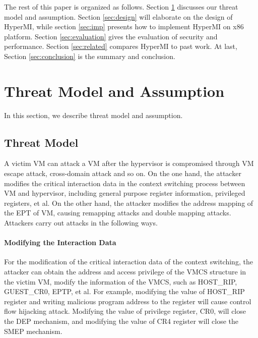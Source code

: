 \documentclass[conference]{IEEEtran}
\begin{document}
The rest of this paper is organized as follows. Section \ref{sec:threat} discusses our threat model and assumption. Section \ref{sec:design} will elaborate on the design of HyperMI, while section \ref{sec:imp} presents how to implement HyperMI on x86 platform. Section \ref{sec:evaluation} gives the evaluation of security and performance. Section \ref{sec:related} compares HyperMI to past work. At last, Section \ref{sec:conclusion} is the summary and conclusion.
\section{Threat Model and Assumption}\label{sec:threat}
In this section, we describe threat model and assumption.
\subsection{Threat Model} \label {threat}
A victim VM can attack a VM after the hypervisor is compromised through VM escape attack, cross-domain attack and so on.
On the one hand, the attacker modifies the critical interaction data in the context switching process between VM and hypervisor, including general purpose register information, privileged registers, et al. On the other hand, the attacker modifies the address mapping of the EPT of VM, causing remapping attacks and double mapping attacks. Attackers carry out attacks in the following ways.
\paragraph{Modifying the Interaction Data}
For the modification of the critical interaction data of the context switching, the attacker can obtain the address and access privilege of the VMCS structure in the victim VM, modify the information of the VMCS, such as HOST\_RIP, GUEST\_CR0, EPTP, et al. For example, modifying the value of HOST\_RIP register and writing malicious program address to the register will cause control flow hijacking attack. Modifying the value of privilege register, CR0, will close the DEP mechanism, and modifying the value of CR4 register will close the SMEP mechanism.
\end{document}
